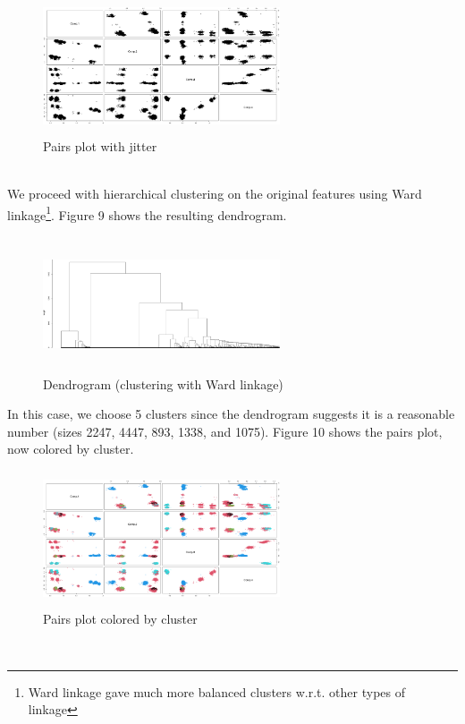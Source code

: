\documentclass[twoside,twocolumn]{article}
\begin{document}
	\begin{figure}[h]
		\caption{Pairs plot with jitter}
		\label{pairsjitter}
		\centering
		\includegraphics[width=70mm, height=40mm]{pairsjitter.png}
	\end{figure}\\
	We proceed with hierarchical clustering on the original features using Ward linkage\footnote{Ward linkage gave much more balanced clusters w.r.t. other types of linkage}. Figure 9 shows the resulting dendrogram.
	\begin{figure}[h]
		\caption{Dendrogram (clustering with Ward linkage)}
		\label{dendrogram}
		\centering
		\includegraphics[width=70mm, height=40mm]{dendrogram.png}
	\end{figure}
	In this case, we choose 5 clusters since the dendrogram suggests it is a reasonable number (sizes 2247, 4447, 893, 1338, and 1075). Figure 10 shows the pairs plot, now colored by cluster. 
	\begin{figure}[h]
		\caption{Pairs plot colored by cluster}
		\label{pairscolored}
		\centering
		\includegraphics[width=70mm, height=40mm]{pairs2.png}
	\end{figure}\\
\end{document}
